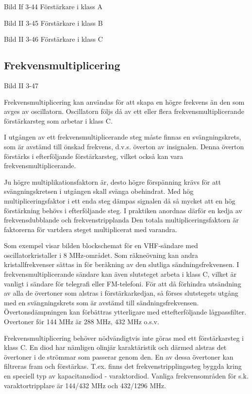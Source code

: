 Bild If 3-44 Förstärkare i klass A

Bild II 3-45 Förstärkare i klass B

Bild II 3-46 Förstärkare i klass C

\subsection{Frekvensmultiplicering}

Bild II 3-47

Frekvensmultiplicering kan användas för att skapa en högre frekvens än
den som avges av oscillatorn. Oscillatorn följs då av ett eller flera
frekvensmultiplicerande förstärkarsteg som arbetar i klass C.

I utgången av ett frekvensmultiplicerande steg måste finnas en
svängningskrets, som är avstämd till önskad frekvens, d.v.s. överton
av insignalen. Denna överton förstärks i efterföljande förstärkarsteg,
vilket också kan vara frekvensmultiplicerande.

Ju högre multiplikationsfaktorn är, desto högre förspänning krävs för
att svängningskretsen i utgången skall svänga obehindrat.  Med hög
multipliceringsfaktor i ett enda steg dämpas signalen då så mycket att
en hög förstärkning behövs i efterföljande steg. I praktiken anordnas
därför en kedja av frekvensdubblande och frekvenstripplanda Den totala
multipliceringsfaktorn är faktorerna för vartdera steget multiplicerat
med varandra.

Som exempel visar bilden blockschemat för en VHF-sändare med
oscillatorkristaller i 8 MHz-området. Som räkneövning kan andra
kristallfrekvenser sättas in för beräkning av den slutliga
sändningsfrekvensen. I frekvensmultiplicerande sändare kan även
slutsteget arbeta i klass C, vilket är vanligt i sändare för telegrafi
eller FM-telefoni. För att då förhindra utsändning av alla de
övertoner som alstras i förstärkarkedjan, så förses slutstegets utgång
med en svängningskrets som är avstämd till sändningsfrekvensen.
Övertonsdämpningen kan förbättras ytterligare med ettefterföljande
lågpassfilter. Overtoner för 144 MHz är 288 MHz, 432 MHz o.s.v.

Frekvensmultiplicering behöver nödvändigtvis inte göras med ett
förstärkarsteg i klass C. En diod har nämligen olinjär karaktäristik
och därmed alstras det övertoner i de strömmar som passerar genom
den. En av dessa övertoner kan filtreras fram och
förstärkas. T.ex. finns det frekvenstripplingssteg byggda kring en
speciell typ av kapacitansdiod - varaktordiod. Vanliga frekvensområden
för s.k. varaktortripplare är 144/432 MHz och 432/1296 MHz.


